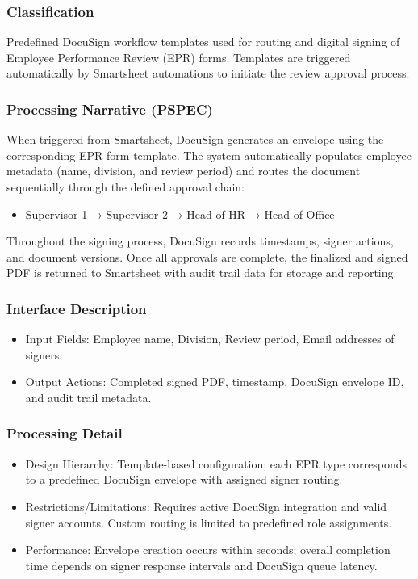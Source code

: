 \documentclass[12pt]{article}
\def\textbf#1{#1}%
\begin{document}
\subsubsection{Classification}
Predefined DocuSign workflow templates used for routing and digital signing of Employee Performance Review (EPR) forms. Templates are triggered automatically by Smartsheet automations to initiate the review approval process.

\subsubsection{Processing Narrative (PSPEC)}
When triggered from Smartsheet, DocuSign generates an envelope using the corresponding EPR form template. The system automatically populates employee metadata (name, division, and review period) and routes the document sequentially through the defined approval chain:
\begin{itemize}[nosep]
  \item Supervisor 1 → Supervisor 2 → Head of HR → Head of Office
\end{itemize}
Throughout the signing process, DocuSign records timestamps, signer actions, and document versions. Once all approvals are complete, the finalized and signed PDF is returned to Smartsheet with audit trail data for storage and reporting.

\subsubsection{Interface Description}
\begin{itemize}[nosep]
  \item \textbf{Input Fields:} Employee name, Division, Review period, Email addresses of signers.
  \item \textbf{Output Actions:} Completed signed PDF, timestamp, DocuSign envelope ID, and audit trail metadata.
\end{itemize}

\subsubsection{Processing Detail}
\begin{itemize}[nosep]
  \item \textbf{Design Hierarchy:} Template-based configuration; each EPR type corresponds to a predefined DocuSign envelope with assigned signer routing.
  \item \textbf{Restrictions/Limitations:} Requires active DocuSign integration and valid signer accounts. Custom routing is limited to predefined role assignments.
  \item \textbf{Performance:} Envelope creation occurs within seconds; overall completion time depends on signer response intervals and DocuSign queue latency.
\end{itemize}
\end{document}
